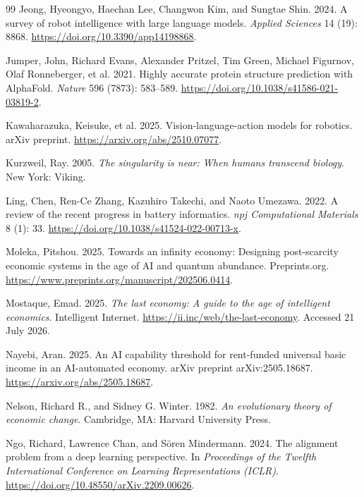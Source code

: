 \documentclass[11pt]{article}
\begin{document}
\begin{thebibliography}{99}
Jeong, Hyeongyo, Haechan Lee, Changwon Kim, and Sungtae Shin. 2024. A survey of robot intelligence with large language models. \textit{Applied Sciences} 14 (19): 8868. \url{https://doi.org/10.3390/app14198868}.

Jumper, John, Richard Evans, Alexander Pritzel, Tim Green, Michael Figurnov, Olaf Ronneberger, et al. 2021. Highly accurate protein structure prediction with AlphaFold. \textit{Nature} 596 (7873): 583--589. \url{https://doi.org/10.1038/s41586-021-03819-2}.

Kawaharazuka, Keisuke, et al. 2025. Vision-language-action models for robotics. arXiv preprint. \url{https://arxiv.org/abs/2510.07077}.

Kurzweil, Ray. 2005. \textit{The singularity is near: When humans transcend biology}. New York: Viking.


Ling, Chen, Ren-Ce Zhang, Kazuhiro Takechi, and Naoto Umezawa. 2022. A review of the recent progress in battery informatics. \textit{npj Computational Materials} 8 (1): 33. \url{https://doi.org/10.1038/s41524-022-00713-x}.


Moleka, Pitshou. 2025. Towards an infinity economy: Designing post-scarcity economic systems in the age of AI and quantum abundance. Preprints.org. \url{https://www.preprints.org/manuscript/202506.0414}.

Mostaque, Emad. 2025. \textit{The last economy: A guide to the age of intelligent economics}. Intelligent Internet. \url{https://ii.inc/web/the-last-economy}. Accessed 21 July 2026.

Nayebi, Aran. 2025. An AI capability threshold for rent-funded universal basic income in an AI-automated economy. arXiv preprint arXiv:2505.18687. \url{https://arxiv.org/abs/2505.18687}.

Nelson, Richard R., and Sidney G. Winter. 1982. \textit{An evolutionary theory of economic change}. Cambridge, MA: Harvard University Press.

Ngo, Richard, Lawrence Chan, and S\"{o}ren Mindermann. 2024. The alignment problem from a deep learning perspective. In \textit{Proceedings of the Twelfth International Conference on Learning Representations (ICLR)}. \url{https://doi.org/10.48550/arXiv.2209.00626}.


\end{thebibliography}
\end{document}
